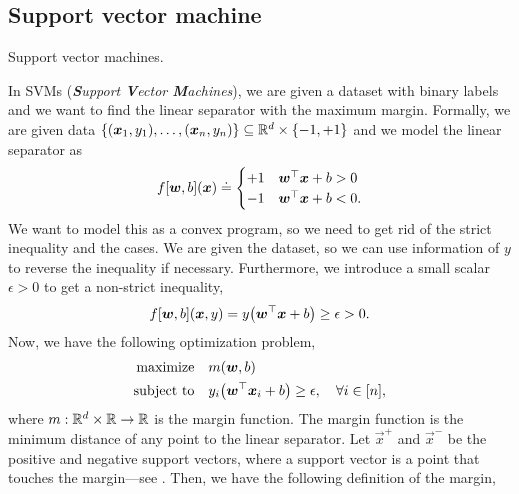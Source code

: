 \subsection{Support vector machine}

\begin{marginfigure}[7cm]
    \centering
    \caption{Support vector machines.}
    \label{fig:svm}
\end{marginfigure}

In SVMs (\textit{\textbf{S}upport \textbf{V}ector \textbf{M}achines}), we are given a dataset with
binary labels and we want to find the linear separator with the maximum margin. Formally, we are
given data $\{ (\bm{x}_1, y_1), \ldots, (\bm{x}_n, y_n) \} \subseteq \mathbb{R}^d \times \{ -1, +1 \}$
and we model the linear separator as \[
    f[\bm{w}, b](\bm{x}) \doteq
    \begin{cases}
        +1 & \bm{w}^\top \bm{x} + b > 0  \\
        -1 & \bm{w}^\top \bm{x} + b < 0.
    \end{cases}
\]
We want to model this as a convex program, so we need to get rid of the strict inequality and the
cases. We are given the dataset, so we can use information of $y$ to reverse the inequality if
necessary. Furthermore, we introduce a small scalar $\epsilon > 0$ to get a non-strict inequality, \[
    f[\vec{w}, b](\vec{x}, y) = y \lft( \transpose{\vec{w}} \vec{x} + b \rgt) \geq \epsilon > 0.
\]
Now, we have the following optimization problem,
\begin{align*}
    \text{maximize}   & \quad m(\vec{w}, b)                                                                             \\
    \text{subject to} & \quad y_i \lft( \transpose{\vec{w}} \vec{x}_i + b \rgt) \geq \epsilon, \quad \forall i \in [n],
\end{align*}
where $m: \mathbb{R}^d \times \mathbb{R} \to \mathbb{R}$ is the margin function. The margin function is the minimum distance
of any point to the linear separator. Let $\vec{x}^+$ and $\vec{x}^-$ be the positive and negative
support vectors, where a support vector is a point that touches the margin---see . Then, we have the following definition of the margin,
